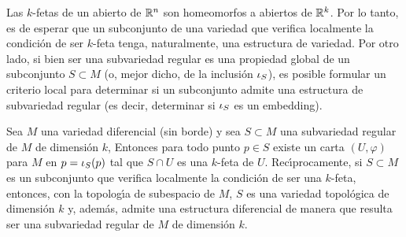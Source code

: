Las $k$-fetas de un abierto de $\bb{R}^{n}$ son homeomorfos a abiertos de
$\bb{R}^{k}$. Por lo tanto, es de esperar que un subconjunto de una variedad
que verifica localmente la condici\'{o}n de ser $k$-feta tenga, naturalmente,
una estructura de variedad. Por otro lado, si bien ser una subvariedad regular
es una propiedad global de un subconjunto $S\subset M$ (o, mejor dicho, de
la inclusi\'{o}n $\inc[S]$), es posible formular un criterio local para
determinar si un subconjunto admite una estructura de subvariedad regular
(es decir, determinar si $\inc[S]$ es un embedding).

\begin{teoDeLasFetas}\label{thm:delasfetas}
	Sea $M$ una variedad diferencial (sin borde) y sea $S\subset M$ una
	subvariedad regular de $M$ de dimensi\'{o}n $k$, Entonces
	para todo punto $p\in S$ existe un carta $(U,\varphi)$ para $M$
	en $p=\inc[S](p)$ tal que $S\cap U$ es una $k$-feta de $U$.
	Rec\'{\i}procamente, si $S\subset M$ es un subconjunto que
	verifica localmente la condici\'{o}n de ser una $k$-feta, entonces,
	con la topolog\'{\i}a de subespacio de $M$, $S$ es una variedad
	topol\'{o}gica de dimensi\'{o}n $k$ y, adem\'{a}s, admite una
	estructura diferencial de manera que resulta ser una subvariedad
	regular de $M$ de dimensi\'{o}n $k$.
\end{teoDeLasFetas}


